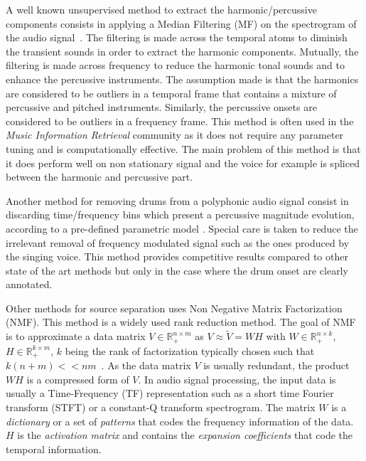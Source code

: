 A well known unsupervised method to extract the harmonic/percussive components consists in applying a Median Filtering (MF) on the spectrogram of the audio signal~\cite{fitzgerald2010harmonic}. The filtering is made across the temporal atoms to diminish the transient sounds in order to extract the harmonic components. Mutually, the filtering is made across frequency to reduce the harmonic tonal sounds and to enhance the percussive instruments. The assumption made is that the harmonics are considered to be outliers in a temporal frame that contains a mixture of percussive and pitched instruments. Similarly, the percussive onsets are considered to be outliers in a frequency frame. This method is often used in the \emph{Music Information Retrieval} community as it does not require any parameter tuning and is computationally effective. The main problem of this method is that it does perform well on non stationary signal and the voice for example is spliced between the harmonic and percussive part. 

Another method for removing drums from a polyphonic audio signal consist in discarding time/frequency bins which present a percussive magnitude evolution, according to a pre-defined parametric model \cite{rigaud2011drum}. Special care is taken to reduce the irrelevant removal of frequency modulated signal such as the ones produced by the singing voice. This method provides competitive results compared to other state of the art methods but only in the case where the drum onset are clearly annotated. 

Other methods for source separation uses Non Negative Matrix Factorization (NMF). This method is a widely used rank reduction method. The goal of NMF is to approximate a data matrix $V \in \mathbb{R}_{+}^{n \times m} $ as $V \approx \tilde{V} = WH$ with $W \in \mathbb{R}_{+}^{n \times k}$, $H \in \mathbb{R}_{+}^{k \times m}$, $k$ being the rank of factorization typically chosen such that \mbox{$k(n+m) << nm  $}~\cite{lee99}. As the data matrix $V$ is usually redundant, the product $WH$ is a compressed form of $V$. In audio signal processing, the input data is usually a Time-Frequency (TF) representation such as a short time Fourier transform (STFT) or a constant-Q transform spectrogram. The matrix $W$ is a {\em dictionary} or a set of {\em patterns} that codes the frequency information of the data. $H$ is the {\em activation matrix} and contains the {\em expansion coefficients} that code the temporal information.

